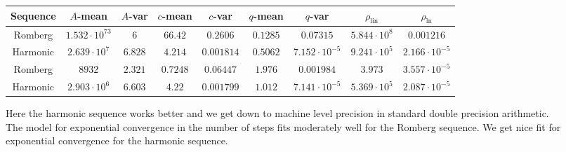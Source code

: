 \begin{table}[H]
    \centering\small
    \begin{tabular}{c||c|c|c|c|c|c|c|c}
Sequence & \(A\)-mean & \(A\)-var & \(c\)-mean & \(c\)-var & \(q\)-mean & \(q\)-var & \(\rho_{\operatorname{lin}}\) & \(\rho_{\ln}\)\\\hline
\rowcolor{red}
Romberg & \(1.532\cdot 10^{73}\) & \(6\) & \(66.42\) & \(0.2606\) & \(0.1285\) & \(0.07315\) & \(5.844\cdot 10^8\) & \(0.001216\) \\
\rowcolor{green}
Harmonic & \(2.639\cdot 10^7\) & \(6.828\) & \(4.214\) & \(0.001814\) & \(0.5062\) & \(7.152\cdot 10^{-5}\) & \(9.241\cdot 10^5\) & \(2.166\cdot 10^{-5}\) \\
\rowcolor{green}
Romberg & \(8932\) & \(2.321\) & \(0.7248\) & \(0.06447\) & \(1.976\) & \(0.001984\) & \(3.973\) & \(3.557\cdot 10^{-5}\) \\
\rowcolor{green}
Harmonic & \(2.903\cdot 10^6\) & \(6.603\) & \(4.22\) & \(0.001799\) & \(1.012\) & \(7.141\cdot 10^{-5}\) & \(5.369\cdot 10^5\) & \(2.087\cdot 10^{-5}\) \\
    \end{tabular}
    \label{tab:my_label}
\end{table}

Here the harmonic sequence works better and we get down to machine level precision in standard double precision arithmetic.\\

The model for exponential convergence in the number of steps fits moderately well for the Romberg sequence. We get nice fit for exponential convergence for the harmonic sequence.

